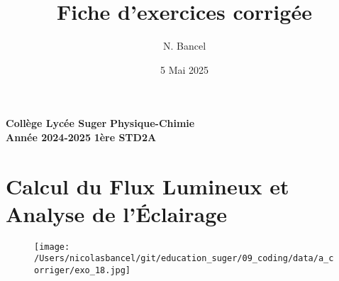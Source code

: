 \documentclass[answers]{exam}
\title{Fiche d'exercices corrigée}
\author{N. Bancel}
\date{5 Mai 2025}
\begin{document}
\textbf{Collège Lycée Suger}
\hfill
\textbf{Physique-Chimie} \\

\textbf{Année 2024-2025}
\hfill
\textbf{1ère STD2A} \par

{\let\newpage\relax\maketitle}




\section*{Calcul du Flux Lumineux et Analyse de l'Éclairage}

    \begin{figure}[H]
      \centering
      \texttt{[image: /Users/nicolasbancel/git/education\_suger/09\_coding/data/a\_corriger/exo\_18.jpg]}
      \captionsetup{labelformat=empty}
    \end{figure}
\end{document}
